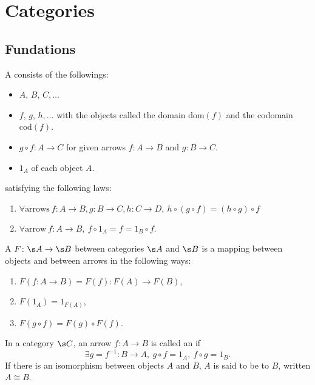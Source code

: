 \newcommand{\sets}{\mathbf{Sets}}
\section{Categories\cite{awodey}}
\subsection{Fundations}
A  consists of the followings:
\begin{itemize}
\item {} $A$, $B$, $C, \dotsc$
\item {} $f$, $g$, $h, \dotsc$ with the objects called the domain $\mathrm{dom}(f)$ and the codomain $\mathrm{cod}(f)$.
\item {} $g \circ f \colon A \to C$ for given arrows $f \colon A \to B$ and $g \colon B \to C$.
\item {} $1_A$ of each object $A$.
\end{itemize}
satisfying the following laws:
\begin{enumerate}
\item $\forall \text{arrows}\ f \colon A \to B, g \colon B \to C, h \colon C \to D,\ h \circ (g \circ f) = (h \circ g) \circ f$
\item $\forall \text{arrow}\ f \colon A \to B,\ f \circ 1_A = f = 1_B \circ f$.
\end{enumerate}

A  $F\colon \s A \to \s B$ between categories $\s A$ and $\s B$ is a mapping between objects and between arrows in the following ways:
\begin{enumerate}
\item $F(f\colon A \to B) = F(f) \colon F(A) \to F(B)$,
\item $F(1_A) = 1_{F(A)}$,
\item $F(g \circ f) = F(g) \circ F(f)$.
\end{enumerate}

In a category $\s C$, an arrow $f \colon A \to B$ is called an  if
\[
\exists g = f^{-1} \colon B \to A,\ g \circ f = 1_A,\ f \circ g = 1_B.
\]
If there is an isomorphism between objects $A$ and $B$, $A$ is said to be  to $B$, written $A \cong B$.
